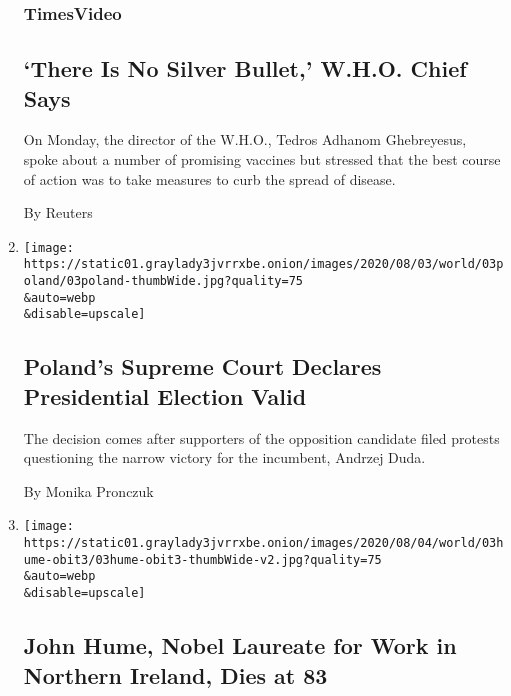 \begin{enumerate}
  \hypertarget{timesvideo}{%
  \subsubsection{TimesVideo}\label{timesvideo}}

  \hypertarget{there-is-no-silver-bullet-who-chief-says}{%
  \subsection{`There Is No Silver Bullet,' W.H.O. Chief
  Says}\label{there-is-no-silver-bullet-who-chief-says}}

  On Monday, the director of the W.H.O., Tedros Adhanom Ghebreyesus,
  spoke about a number of promising vaccines but stressed that the best
  course of action was to take measures to curb the spread of disease.

  By Reuters
\item
  \href{/2020/08/03/world/europe/poland-court-presidential-election.html}{}

  \texttt{[image: https://static01.graylady3jvrrxbe.onion/images/2020/08/03/world/03poland/03poland-thumbWide.jpg?quality=75\\\&auto=webp\\\&disable=upscale]}

  \hypertarget{polands-supreme-court-declares-presidential-election-valid}{%
  \subsection{Poland's Supreme Court Declares Presidential Election
  Valid}\label{polands-supreme-court-declares-presidential-election-valid}}

  The decision comes after supporters of the opposition candidate filed
  protests questioning the narrow victory for the incumbent, Andrzej
  Duda.

  By Monika Pronczuk
\item
  \href{/2020/08/03/obituaries/john-hume-dies.html}{}

  \texttt{[image: https://static01.graylady3jvrrxbe.onion/images/2020/08/04/world/03hume-obit3/03hume-obit3-thumbWide-v2.jpg?quality=75\\\&auto=webp\\\&disable=upscale]}

  \hypertarget{john-hume-nobel-laureate-for-work-in-northern-ireland-dies-at-83}{%
  \subsection{John Hume, Nobel Laureate for Work in Northern Ireland,
  Dies at
  83}\label{john-hume-nobel-laureate-for-work-in-northern-ireland-dies-at-83}}


\end{enumerate}
